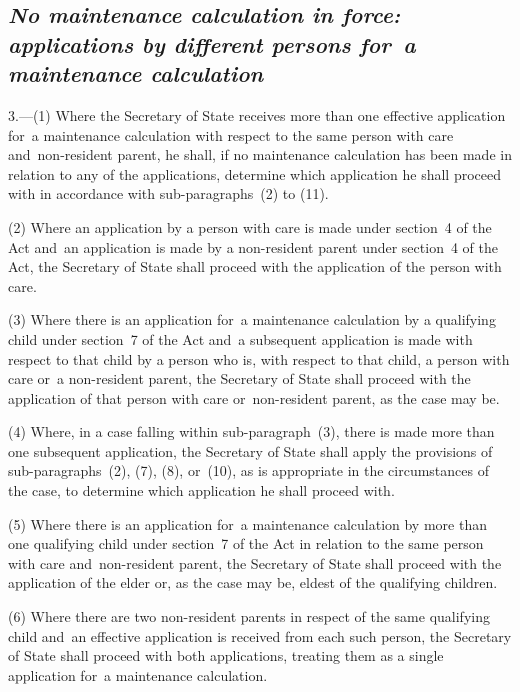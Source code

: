 \documentclass[12pt,a4paper]{article}
\begin{document}
\subsection*{\itshape No maintenance calculation in force: applications by different persons for~a maintenance calculation}

3.---(1)  Where the Secretary of State receives more than one effective application for~a maintenance calculation with respect to the same person with care and~non-resident parent, he shall, if no maintenance calculation has been made in relation to any of the applications, determine which application he shall proceed with in accordance with sub-paragraphs~(2) to (11).

(2) Where an application by a person with care is made under section~4 of the Act 
and~an application is made by a non-resident parent under section~4 of the Act, the Secretary of State shall proceed with the application of the person with care.

(3) Where there is an application for~a maintenance calculation by a qualifying child under section~7 of the Act and~a subsequent application is made with respect to that child by a person who is, with respect to that child, a person with care or~a non-resident parent, the Secretary of State shall proceed with the application of that person with care or~non-resident parent, as the case may be.

(4) Where, in a case falling within sub-paragraph~(3), there is made more than one subsequent application, the Secretary of State shall apply the provisions of sub-paragraphs~(2), (7), (8), or~(10), as is appropriate in the circumstances of the case, to determine which application he shall proceed with.

(5) Where there is an application for~a maintenance calculation by more than one qualifying child under section~7 of the Act in relation to the same person with care and~non-resident parent, the Secretary of State shall proceed with the application of the elder or, as the case may be, eldest of the qualifying children.

(6) Where there are two non-resident parents in respect of the same qualifying child and~an effective application is received from each such person, the Secretary of State shall proceed with both applications, treating them as a single application for~a maintenance calculation.

\end{document}
